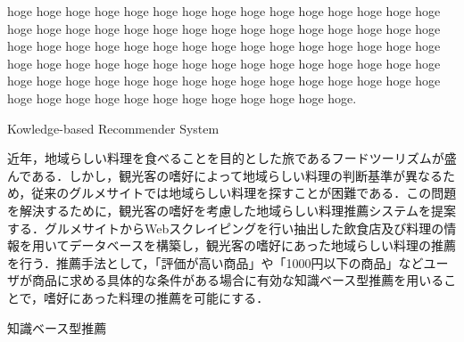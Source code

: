 \documentclass{funthesis}
\begin{document}
\maketitle       %

\begin{eabstract}
hoge hoge hoge hoge hoge hoge hoge hoge hoge hoge hoge hoge hoge hoge hoge hoge hoge hoge hoge hoge hoge hoge hoge hoge hoge hoge hoge hoge hoge hoge hoge hoge hoge hoge hoge hoge hoge hoge hoge hoge hoge hoge hoge hoge hoge hoge hoge hoge hoge hoge hoge hoge hoge hoge hoge hoge hoge hoge hoge hoge hoge hoge hoge hoge hoge hoge hoge hoge hoge hoge hoge hoge hoge hoge hoge hoge hoge hoge hoge hoge hoge hoge hoge hoge hoge hoge hoge.
\end{eabstract}

\begin{ekeyword}
Kowledge-based Recommender System
\end{ekeyword}

\begin{jabstract}
近年，地域らしい料理を食べることを目的とした旅であるフードツーリズムが盛んである．しかし，観光客の嗜好によって地域らしい料理の判断基準が異なるため，従来のグルメサイトでは地域らしい料理を探すことが困難である．この問題を解決するために，観光客の嗜好を考慮した地域らしい料理推薦システムを提案する．グルメサイトからWebスクレイピングを行い抽出した飲食店及び料理の情報を用いてデータベースを構築し，観光客の嗜好にあった地域らしい料理の推薦を行う．推薦手法として，「評価が高い商品」や「1000円以下の商品」などユーザが商品に求める具体的な条件がある場合に有効な知識ベース型推薦を用いることで，嗜好にあった料理の推薦を可能にする．

\end{jabstract}

\begin{jkeyword}
知識ベース型推薦
\end{jkeyword}

\tableofcontents %



\end{document}
